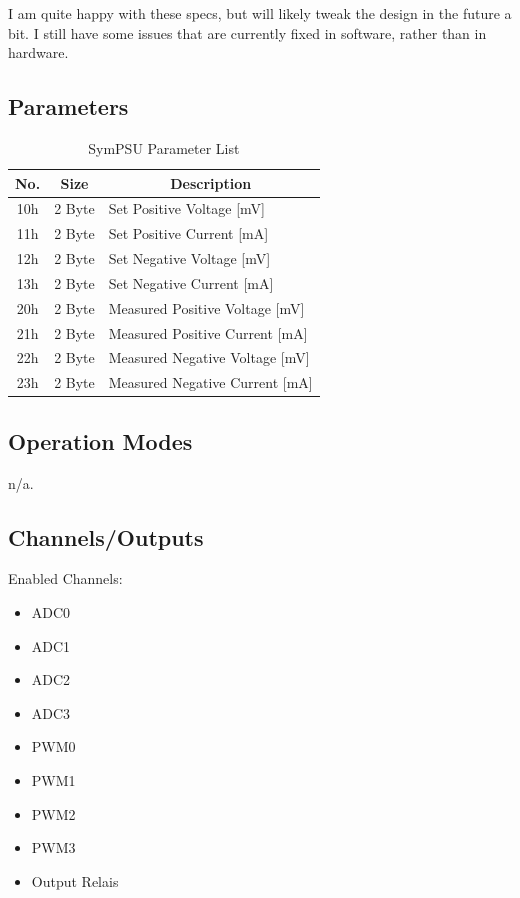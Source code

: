 I am quite happy with these specs, but will likely tweak the design in the future a bit. I still have some issues that are currently fixed in software, rather than in hardware. 

\subsection{Parameters}
\begin{table}[H]
    \centering
    \begin{tabular}{|c|c|l|}
        \hline
        \textbf{No.}   &   \textbf{Size} & \multicolumn{1}{|c|}{\textbf{Description}}\\ \hline \hline
        10h   &  2 Byte &  Set Positive Voltage [mV]\\ \hline
		11h   &  2 Byte &  Set Positive Current [mA]\\ \hline
		12h   &  2 Byte &  Set Negative Voltage [mV]\\ \hline
		13h   &  2 Byte &  Set Negative Current [mA]\\ \hline
		20h   &  2 Byte &  Measured Positive Voltage [mV]\\ \hline
		21h   &  2 Byte &  Measured Positive Current [mA]\\ \hline
		22h   &  2 Byte &  Measured Negative Voltage [mV]\\ \hline
		23h   &  2 Byte &  Measured Negative Current [mA]\\ \hline
    \end{tabular}
	\caption{SymPSU Parameter List}
\label{tab:Par-SymPSU}
\end{table}
\subsection{Operation Modes}
n/a.
\subsection{Channels/Outputs}
Enabled Channels:
\begin{itemize}
	\item ADC0
	\item ADC1
	\item ADC2
	\item ADC3
	\item PWM0
	\item PWM1
	\item PWM2
	\item PWM3
	\item Output Relais
\end{itemize}

